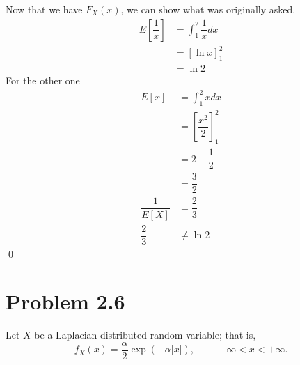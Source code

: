 \documentclass[11pt]{article}
\begin{document}
\begin{enumerate}[label=(\alph*)]
\begin{solution}
        Now that we have $F_X(x)$, we can show what was originally asked.
        \begin{align*}
            E\left[\dfrac{1}{x}\right] &= \int_{1}^{2} \dfrac{1}{x} dx \\
            &= \left[\ln{x}\right]_{1}^{2} \\
            &= \ln{2}
        \end{align*}
        For the other one
        \begin{align*}
            E[x] &= \int_{1}^{2} x dx \\
            &= \left[\dfrac{x^2}{2}\right]_{1}^{2} \\
            &= 2 - \dfrac{1}{2} \\
            &= \dfrac{3}{2} \\
            \dfrac{1}{E[X]} &= \dfrac{2}{3} \\
            \dfrac{2}{3} &\neq \ln{2}
        \end{align*}
        \qed
    \end{solution}

    \vspace{5em}

\end{enumerate}

\newpage
\section*{Problem 2.6}
Let $X$ be a Laplacian-distributed random variable; that is,
\[
    f_X(x) = \frac{\alpha}{2} \exp(-\alpha |x|), \qquad -\infty < x < +\infty.
\]
\end{document}
